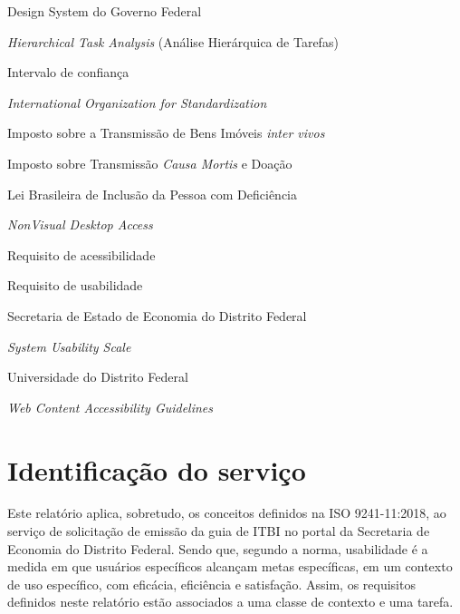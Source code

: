 \documentclass[
  12pt,
  oneside,
  a4paper,
  chapter=TITLE,
  section=TITLE,
  english,
  brazilian
]{abntex2}
\begin{document}
\begin{siglas}
  \item[DSGov]  Design System do Governo Federal
  \item[HTA]    \textit{Hierarchical Task Analysis} (Análise Hierárquica de Tarefas)
  \item[IC]     Intervalo de confiança
  \item[ISO]    \textit{International Organization for Standardization}
  \item[ITBI]   Imposto sobre a Transmissão de Bens Imóveis \textit{inter vivos}
  \item[ITCD]   Imposto sobre Transmissão \textit{Causa Mortis} e Doação
  \item[LBI]    Lei Brasileira de Inclusão da Pessoa com Deficiência
  \item[NVDA]   \textit{NonVisual Desktop Access}
  \item[RA]     Requisito de acessibilidade
  \item[RU]     Requisito de usabilidade
  \item[SEEC]   Secretaria de Estado de Economia do Distrito Federal
  \item[SUS]    \textit{System Usability Scale}
  \item[UnDF]   Universidade do Distrito Federal
  \item[WCAG]   \textit{Web Content Accessibility Guidelines}
\end{siglas}

\tableofcontents*
\cleardoublepage

\textual

\chapter{Identificação do serviço}\label{cap:identificacao}

Este relatório aplica, sobretudo, os conceitos definidos na ISO 9241-11:2018, ao serviço de solicitação de emissão da guia de ITBI no
portal da Secretaria de Economia do Distrito Federal. Sendo que, segundo a norma, usabilidade é a medida em que usuários
específicos alcançam metas específicas, em um contexto de uso específico, com
eficácia, eficiência e satisfação. Assim, os requisitos definidos neste relatório estão associados a uma classe de contexto e uma tarefa.
\end{document}
